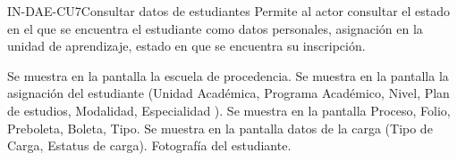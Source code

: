\begin{UseCase}{IN-DAE-CU7}{Consultar datos de estudiantes}{
	Permite al actor consultar el estado en el que se encuentra el estudiante como datos personales, asignación en la unidad de aprendizaje, estado en que se encuentra su inscripción. 	
}
{\begin{Titemize}
\begin{Citemize}
					 \item {} 
					 \item {} 
					 \item {} 
					 \item {} 
					 \item {} 
                \end{Citemize}
    	 	\Titem Se muestra en la pantalla la escuela de procedencia.
    		\Titem Se muestra en la pantalla la asignación del estudiante (Unidad Académica, Programa Académico, Nivel, Plan de estudios, Modalidad, Especialidad ).
    		\Titem Se muestra en la pantalla Proceso, Folio, Preboleta, Boleta, Tipo.
    		\Titem Se muestra en la pantalla datos de la carga (Tipo de Carga, Estatus de carga).
    		\Titem Fotografía del estudiante.
    	\end{Titemize}			
    }

\end{UseCase}
